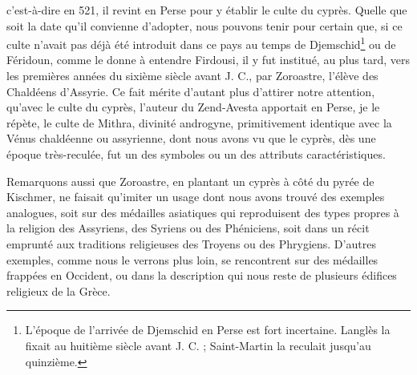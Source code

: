 \documentclass[a4paper, 11pt, oneside, polutonikogreek, french]{article}
\begin{document}
c'est-à-dire en 521, il revint en Perse pour y établir le culte du cyprès. Quelle que soit la date qu'il convienne d'adopter, nous pouvons tenir pour certain que, si ce culte n'avait pas déjà été introduit dans ce pays au temps de Djemschid\footnote{L'époque de l'arrivée de Djemschid en Perse est fort incertaine. Langlès la fixait au huitième siècle avant J. C. ; Saint-Martin la reculait jusqu'au quinzième.} ou de Féridoun, comme le donne à entendre Firdousi, il y fut institué, au plus tard, vers les premières années du sixième siècle avant J. C., par Zoroastre, l'élève des Chaldéens d'Assyrie. Ce fait mérite d'autant plus d'attirer notre attention, qu'avec le culte du cyprès, l'auteur du Zend-Avesta apportait en Perse, je le répète, le culte de Mithra, divinité androgyne, primitivement identique avec la Vénus chaldéenne ou assyrienne, dont nous avons vu que le cyprès, dès une époque très-reculée, fut un des symboles ou un des attributs caractéristiques.

Remarquons aussi que Zoroastre, en plantant un cyprès à côté du pyrée de Kischmer, ne faisait qu'imiter un usage dont nous avons trouvé des exemples analogues, soit sur des médailles asiatiques qui reproduisent des types propres à la religion des Assyriens, des Syriens ou des Phéniciens, soit dans un récit emprunté aux traditions religieuses des Troyens ou des Phrygiens. D'autres exemples, comme nous le verrons plus loin, se rencontrent sur des médailles frappées en Occident, ou dans la description qui nous reste de plusieurs édifices religieux de la Grèce.
\end{document}
